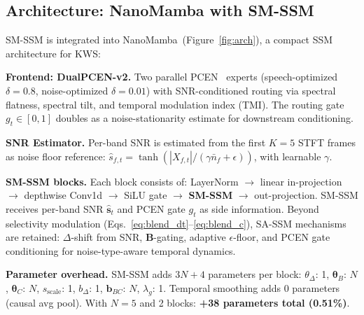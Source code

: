 \documentclass{Interspeech}
\begin{document}
\subsection{Architecture: NanoMamba with SM-SSM}
\label{sec:arch}

SM-SSM is integrated into NanoMamba~(Figure~\ref{fig:arch}), a compact SSM architecture for KWS:

\smallskip\noindent\textbf{Frontend: DualPCEN-v2.}
Two parallel PCEN~\cite{wang2017trainable} experts (speech-optimized $\delta{=}0.8$, noise-optimized $\delta{=}0.01$) with SNR-conditioned routing via spectral flatness, spectral tilt, and temporal modulation index (TMI).
The routing gate $g_t \in [0,1]$ doubles as a noise-stationarity estimate for downstream conditioning.

\smallskip\noindent\textbf{SNR Estimator.}
Per-band SNR is estimated from the first $K{=}5$ STFT frames as noise floor reference: $\hat{s}_{f,t} = \tanh(|X_{f,t}| / (\gamma \bar{n}_f {+} \epsilon))$, with learnable $\gamma$.

\smallskip\noindent\textbf{SM-SSM blocks.}
Each block consists of: LayerNorm $\to$ linear in-projection $\to$ depthwise Conv1d $\to$ SiLU gate $\to$ \textbf{SM-SSM} $\to$ out-projection.
SM-SSM receives per-band SNR $\hat{\mathbf{s}}_t$ and PCEN gate $g_t$ as side information.
Beyond selectivity modulation (Eqs.~\ref{eq:blend_dt}--\ref{eq:blend_c}), SA-SSM mechanisms are retained: $\Delta$-shift from SNR, $\mathbf{B}$-gating, adaptive $\epsilon$-floor, and PCEN gate conditioning for noise-type-aware temporal dynamics.

\smallskip\noindent\textbf{Parameter overhead.}
SM-SSM adds $3N{+}4$ parameters per block: $\theta_\Delta$: 1, $\bm{\theta}_B$: $N$, $\bm{\theta}_C$: $N$, $s_{\text{scale}}$: 1, $b_\Delta$: 1, $\mathbf{b}_{BC}$: $N$, $\lambda_g$: 1.
Temporal smoothing adds 0 parameters (causal avg pool).
With $N{=}5$ and 2 blocks: \textbf{+38 parameters total (0.51\%)}.
\end{document}
